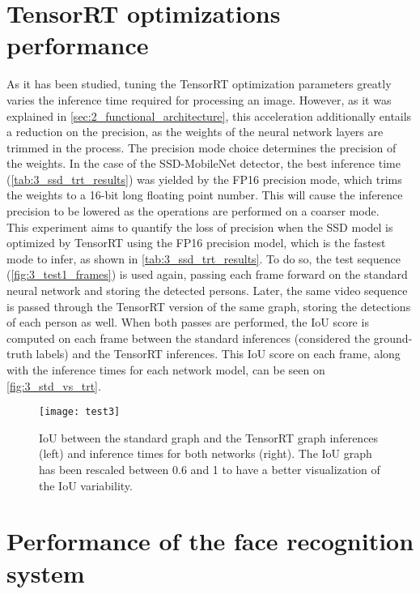 \section{TensorRT optimizations performance}

As it has been studied, tuning the TensorRT optimization parameters greatly varies the inference time required for processing an image. However, as it was explained in \autoref{sec:2_functional_architecture}, this acceleration additionally entails a reduction on the precision, as the weights of the neural network layers are trimmed in the process. The precision mode choice determines the precision of the weights. In the case of the SSD-MobileNet detector, the best inference time (\autoref{tab:3_ssd_trt_results}) was yielded by the FP16 precision mode, which trims the weights to a 16-bit long floating point number. This will cause the inference precision to be lowered as the operations are performed on a coarser mode.\\

This experiment aims to quantify the loss of precision when the SSD model is optimized by TensorRT using the FP16 precision model, which is the fastest mode to infer, as shown in \autoref{tab:3_ssd_trt_results}. To do so, the test sequence (\autoref{fig:3_test1_frames}) is used again, passing each frame forward on the standard neural network and storing the detected persons. Later, the same video sequence is passed through the TensorRT version of the same graph, storing the detections of each person as well. When both passes are performed, the IoU score is computed on each frame between the standard inferences (considered the ground-truth labels) and the TensorRT inferences. This IoU score on each frame, along with the inference times for each network model, can be seen on \autoref{fig:3_std_vs_trt}.

\begin{figure}[h]
	\centering
	\texttt{[image: test3]}
	\caption{IoU between the standard graph and the TensorRT graph inferences (left) and inference times for both networks (right). The IoU graph has been rescaled between 0.6 and 1 to have a better visualization of the IoU variability.}
	\label{fig:3_std_vs_trt}
\end{figure}



\section{Performance of the face recognition system}

